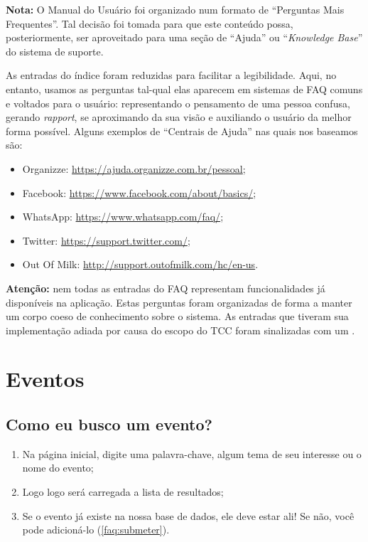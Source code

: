 \documentclass[12pt,a4paper,twoside,hyphens,english,brazil]{abntex2}
\newcommand{\adiado}{{\color{Bittersweet}\framebox[1.1\width]{ADIADO}}}
\begin{document}
{\begin{framed}
	\noindent
	\textbf{Nota:} O Manual do Usuário foi organizado num formato de ``Perguntas Mais Frequentes''. Tal decisão foi tomada para que este conteúdo possa, posteriormente, ser aproveitado para uma seção de ``Ajuda'' ou ``\emph{Knowledge Base}'' do sistema de suporte.
	
	As entradas do índice foram reduzidas para facilitar a legibilidade. Aqui, no entanto, usamos as perguntas tal-qual elas aparecem em sistemas de FAQ comuns e voltados para o usuário: representando o pensamento de uma pessoa confusa, gerando \emph{rapport}, se aproximando da sua visão e auxiliando o usuário da melhor forma possível. Alguns exemplos de ``Centrais de Ajuda'' nas quais nos baseamos são:
	\begin{itemize}[itemsep=-1ex,topsep=-1ex]
		\item Organizze: \url{https://ajuda.organizze.com.br/pessoal};
		\item Facebook: \url{https://www.facebook.com/about/basics/};
		\item WhatsApp: \url{https://www.whatsapp.com/faq/};
		\item Twitter: \url{https://support.twitter.com/};
		\item Out Of Milk: \url{http://support.outofmilk.com/hc/en-us}.
	\end{itemize}
\end{framed}

\begin{framed}
	\noindent
	\textbf{Atenção:} nem todas as entradas do FAQ representam funcionalidades já disponíveis na aplicação. Estas perguntas foram organizadas de forma a manter um corpo coeso de conhecimento sobre o sistema. As entradas que tiveram sua implementação adiada por causa do escopo do TCC foram sinalizadas com um \adiado.
\end{framed}

\section{Eventos} %
\subsection{Como eu busco um evento?} \label{faq:busca}
\begin{enumerate}[itemsep=-1ex]
	\item Na página inicial, digite uma palavra-chave, algum tema de seu interesse ou o nome do evento;
	\item Logo logo será carregada a lista de resultados;
	\item Se o evento já existe na nossa base de dados, ele deve estar ali! Se não, você pode adicioná-lo (\autoref{faq:submeter}).
\end{enumerate}

}
\end{document}
